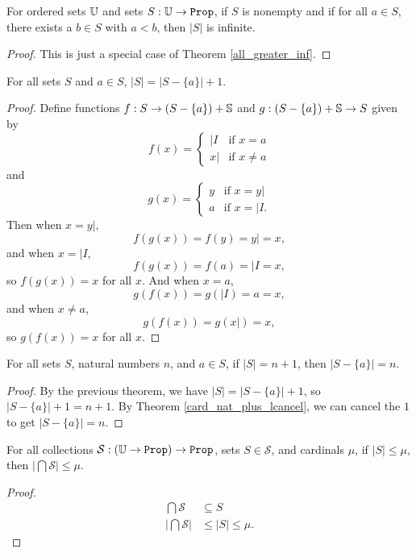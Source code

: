 \documentclass[../../math.tex]{subfiles}
\begin{document}
\begin{theorem} \label{all_greater_inf_set}
    For ordered sets $\U$ and sets $S : \U \to \Prop$, if $S$ is nonempty and if
    for all $a \in S$, there exists a $b \in S$ with $a < b$, then $|S|$ is
    infinite.
\end{theorem}
\begin{proof}
    This is just a special case of Theorem \ref{all_greater_inf}.
\end{proof}

\begin{theorem} \label{card_plus_one}
    For all sets $S$ and $a \in S$, $|S| = |S - \{a\}| + 1$.
\end{theorem}
\begin{proof}
    Define functions $f : S \to (S - \{a\}) + \S$ and $g : (S - \{a\}) + \S \to
    S$ given by
    \[
        f(x) = \begin{cases}
            |I & \text{if $x = a$} \\
            x| & \text{if $x \neq a$}
        \end{cases}
    \]
    and
    \[
        g(x) = \begin{cases}
            y & \text{if $x = y|$} \\
            a & \text{if $x = |I$.}
        \end{cases}
    \]
    Then when $x = y|$,
    \[
        f(g(x)) = f(y) = y| = x,
    \]
    and when $x = |I$,
    \[
        f(g(x)) = f(a) = |I = x,
    \]
    so $f(g(x)) = x$ for all $x$.  And when $x = a$,
    \[
        g(f(x)) = g(|I) = a = x,
    \]
    and when $x \neq a$,
    \[
        g(f(x)) = g(x|) = x,
    \]
    so $g(f(x)) = x$ for all $x$.
\end{proof}

\begin{theorem} \label{card_plus_one_nat}
    For all sets $S$, natural numbers $n$, and $a \in S$, if $|S| = n + 1$, then
    $|S - \{a\}| = n$.
\end{theorem}
\begin{proof}
    By the previous theorem, we have $|S| = |S - \{a\}| + 1$, so $|S - \{a\}| +
    1 = n + 1$.  By Theorem \ref{card_nat_plus_lcancel}, we can cancel the $1$
    to get $|S - \{a\}| = n$.
\end{proof}

\begin{theorem} \label{inter_le}
    For all collections $\mathcal S : (\U \to \Prop) \to \Prop$, sets $S \in
    \mathcal S$, and cardinals $\mu$, if $|S| \leq \mu$, then $|\bigcap \mathcal
    S| \leq \mu$.
\end{theorem}
\begin{proof}
    \begin{align*}
        \bigcap \mathcal S &\subseteq S \\
        \left|\bigcap \mathcal S\right| &\leq |S| \leq \mu.
    \end{align*}
\end{proof}
\end{document}

